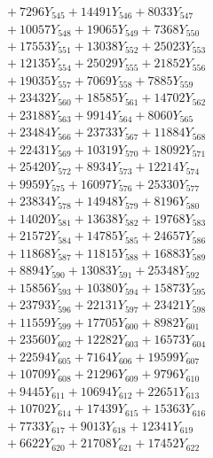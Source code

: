 \documentclass[a4paper,10pt]{article}
\begin{document}
{\begin{align}
&\;  + 7296 Y_{545} + 14491 Y_{546} + 8033 Y_{547} \\[0.3ex]
&\;  + 10057 Y_{548} + 19065 Y_{549} + 7368 Y_{550} \\[0.3ex]
&\;  + 17553 Y_{551} + 13038 Y_{552} + 25023 Y_{553} \\[0.3ex]
&\;  + 12135 Y_{554} + 25029 Y_{555} + 21852 Y_{556} \\[0.3ex]
&\;  + 19035 Y_{557} + 7069 Y_{558} + 7885 Y_{559} \\[0.3ex]
&\;  + 23432 Y_{560} + 18585 Y_{561} + 14702 Y_{562} \\[0.3ex]
&\;  + 23188 Y_{563} + 9914 Y_{564} + 8060 Y_{565} \\[0.3ex]
&\;  + 23484 Y_{566} + 23733 Y_{567} + 11884 Y_{568} \\[0.5ex]\allowbreak
&\;  + 22431 Y_{569} + 10319 Y_{570} + 18092 Y_{571} \\[0.3ex]
&\;  + 25420 Y_{572} + 8934 Y_{573} + 12214 Y_{574} \\[0.3ex]
&\;  + 9959 Y_{575} + 16097 Y_{576} + 25330 Y_{577} \\[0.3ex]
&\;  + 23834 Y_{578} + 14948 Y_{579} + 8196 Y_{580} \\[0.3ex]
&\;  + 14020 Y_{581} + 13638 Y_{582} + 19768 Y_{583} \\[0.3ex]
&\;  + 21572 Y_{584} + 14785 Y_{585} + 24657 Y_{586} \\[0.3ex]
&\;  + 11868 Y_{587} + 11815 Y_{588} + 16883 Y_{589} \\[0.3ex]
&\;  + 8894 Y_{590} + 13083 Y_{591} + 25348 Y_{592} \\[0.3ex]
&\;  + 15856 Y_{593} + 10380 Y_{594} + 15873 Y_{595} \\[0.3ex]
&\;  + 23793 Y_{596} + 22131 Y_{597} + 23421 Y_{598} \\[0.5ex]\allowbreak
&\;  + 11559 Y_{599} + 17705 Y_{600} + 8982 Y_{601} \\[0.3ex]
&\;  + 23560 Y_{602} + 12282 Y_{603} + 16573 Y_{604} \\[0.3ex]
&\;  + 22594 Y_{605} + 7164 Y_{606} + 19599 Y_{607} \\[0.3ex]
&\;  + 10709 Y_{608} + 21296 Y_{609} + 9796 Y_{610} \\[0.3ex]
&\;  + 9445 Y_{611} + 10694 Y_{612} + 22651 Y_{613} \\[0.3ex]
&\;  + 10702 Y_{614} + 17439 Y_{615} + 15363 Y_{616} \\[0.3ex]
&\;  + 7733 Y_{617} + 9013 Y_{618} + 12341 Y_{619} \\[0.3ex]
&\;  + 6622 Y_{620} + 21708 Y_{621} + 17452 Y_{622} \\[0.3ex]

\end{align}}
\end{document}
